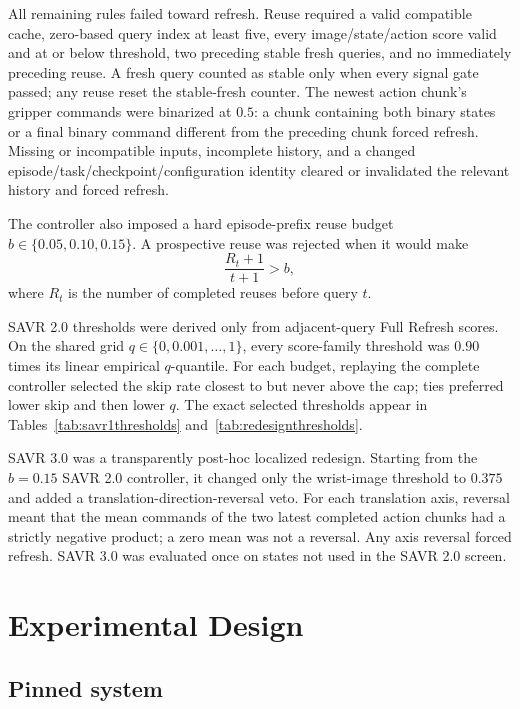 \documentclass[11pt]{article}
\begin{document}
All remaining rules failed toward refresh. Reuse required a valid compatible cache, zero-based query index at least five, every image/state/action score valid and at or below threshold, two preceding stable fresh queries, and no immediately preceding reuse. A fresh query counted as stable only when every signal gate passed; any reuse reset the stable-fresh counter. The newest action chunk's gripper commands were binarized at $0.5$: a chunk containing both binary states or a final binary command different from the preceding chunk forced refresh. Missing or incompatible inputs, incomplete history, and a changed episode/task/checkpoint/configuration identity cleared or invalidated the relevant history and forced refresh.

The controller also imposed a hard episode-prefix reuse budget $b\in\{0.05,0.10,0.15\}$. A prospective reuse was rejected when it would make
\begin{equation}
\frac{R_t+1}{t+1}>b,
\label{eq:prefixcap}
\end{equation}
where $R_t$ is the number of completed reuses before query $t$.

SAVR 2.0 thresholds were derived only from adjacent-query Full Refresh scores. On the shared grid $q\in\{0,0.001,\ldots,1\}$, every score-family threshold was $0.90$ times its linear empirical $q$-quantile. For each budget, replaying the complete controller selected the skip rate closest to but never above the cap; ties preferred lower skip and then lower $q$. The exact selected thresholds appear in Tables~\ref{tab:savr1thresholds} and~\ref{tab:redesignthresholds}.

SAVR 3.0 was a transparently post-hoc localized redesign. Starting from the $b=0.15$ SAVR 2.0 controller, it changed only the wrist-image threshold to $0.375$ and added a translation-direction-reversal veto. For each translation axis, reversal meant that the mean commands of the two latest completed action chunks had a strictly negative product; a zero mean was not a reversal. Any axis reversal forced refresh. SAVR 3.0 was evaluated once on states not used in the SAVR 2.0 screen.

\section{Experimental Design}

\subsection{Pinned system}
\end{document}
